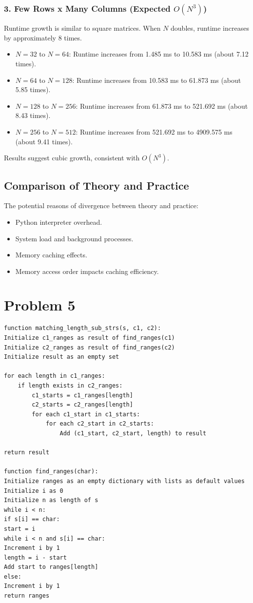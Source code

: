 \documentclass[12 pt]{article}
\begin{document}
\subsubsection*{3. Few Rows x Many Columns (Expected $O(N^3)$)}
Runtime growth is similar to square matrices. When $N$ doubles, runtime increases by approximately 8 times.

    \begin{itemize}
        \item $N = 32$ to $N = 64$: Runtime increases from 1.485 ms to 10.583 ms (about 7.12 times).
        \item $N = 64$ to $N = 128$: Runtime increases from 10.583 ms to 61.873 ms (about 5.85 times).
        \item $N = 128$ to $N = 256$: Runtime increases from 61.873 ms to 521.692 ms (about 8.43 times).
        \item $N = 256$ to $N = 512$: Runtime increases from 521.692 ms to 4909.575 ms (about 9.41 times).
    \end{itemize}
Results suggest cubic growth, consistent with $O(N^3)$.


\subsection*{Comparison of Theory and Practice}
The potential reasons of divergence between theory and practice:
    \begin{itemize}
        \item Python interpreter overhead.
        \item System load and background processes.
        \item Memory caching effects.
        \item Memory access order impacts caching efficiency.
    \end{itemize}

\vspace{1cm}

\section*{Problem 5}

\begin{verbatim}
function matching_length_sub_strs(s, c1, c2):
Initialize c1_ranges as result of find_ranges(c1)
Initialize c2_ranges as result of find_ranges(c2)
Initialize result as an empty set

for each length in c1_ranges:
    if length exists in c2_ranges:
        c1_starts = c1_ranges[length]
        c2_starts = c2_ranges[length]
        for each c1_start in c1_starts:
            for each c2_start in c2_starts:
                Add (c1_start, c2_start, length) to result

return result

function find_ranges(char):
Initialize ranges as an empty dictionary with lists as default values
Initialize i as 0
Initialize n as length of s
while i < n:
if s[i] == char:
start = i
while i < n and s[i] == char:
Increment i by 1
length = i - start
Add start to ranges[length]
else:
Increment i by 1
return ranges
\end{verbatim}
\end{document}
